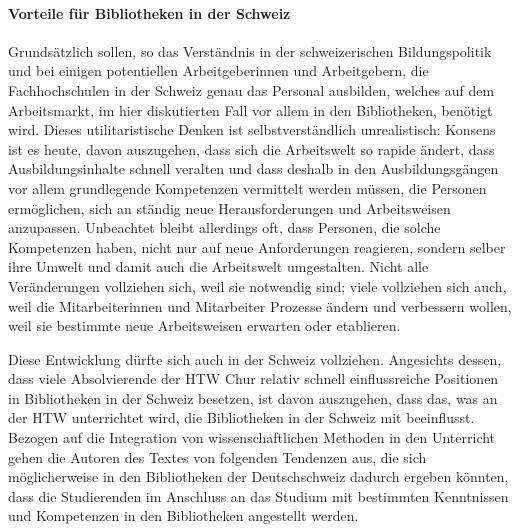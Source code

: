 \documentclass[a4paper,
fontsize=11pt,
oneside,
numbers=noperiodatend,
parskip=half-,
bibliography=totoc,
final
]{scrartcl}
\begin{document}
\paragraph{Vorteile für Bibliotheken in der
Schweiz}\label{vorteile-fuxfcr-bibliotheken-in-der-schweiz}

Grundsätzlich sollen, so das Verständnis in der schweizerischen
Bildungspolitik und bei einigen potentiellen Arbeitgeberinnen und
Arbeitgebern, die Fachhochschulen in der Schweiz genau das Personal
ausbilden, welches auf dem Arbeitsmarkt, im hier diskutierten Fall vor
allem in den Bibliotheken, benötigt wird. Dieses utilitaristische Denken
ist selbstverständlich unrealistisch: Konsens ist es heute, davon
auszugehen, dass sich die Arbeitswelt so rapide ändert, dass
Ausbildungsinhalte schnell veralten und dass deshalb in den
Ausbildungsgängen vor allem grundlegende Kompetenzen vermittelt werden
müssen, die Personen ermöglichen, sich an ständig neue Herausforderungen
und Arbeitsweisen anzupassen. Unbeachtet bleibt allerdings oft, dass
Personen, die solche Kompetenzen haben, nicht nur auf neue Anforderungen
reagieren, sondern selber ihre Umwelt und damit auch die Arbeitswelt
umgestalten. Nicht alle Veränderungen vollziehen sich, weil sie
notwendig sind; viele vollziehen sich auch, weil die Mitarbeiterinnen
und Mitarbeiter Prozesse ändern und verbessern wollen, weil sie
bestimmte neue Arbeitsweisen erwarten oder etablieren.

Diese Entwicklung dürfte sich auch in der Schweiz vollziehen. Angesichts
dessen, dass viele Absolvierende der HTW Chur relativ schnell
einflussreiche Positionen in Bibliotheken in der Schweiz besetzen, ist
davon auszugehen, dass das, was an der HTW unterrichtet wird, die
Bibliotheken in der Schweiz mit beeinflusst. Bezogen auf die Integration
von wissenschaftlichen Methoden in den Unterricht gehen die Autoren des
Textes von folgenden Tendenzen aus, die sich möglicherweise in den
Bibliotheken der Deutschschweiz dadurch ergeben könnten, dass die
Studierenden im Anschluss an das Studium mit bestimmten Kenntnissen und
Kompetenzen in den Bibliotheken angestellt werden.
\end{document}
